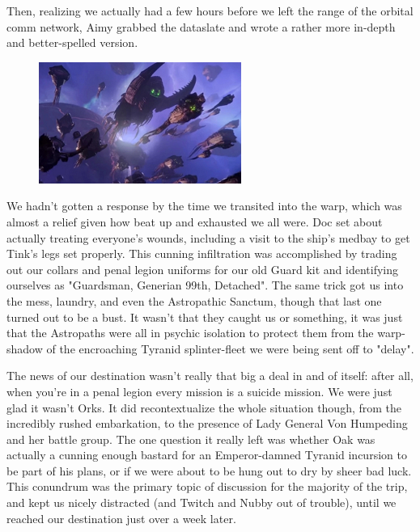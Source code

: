 Then, realizing we actually had a few hours before we left the range of the orbital comm network, Aimy grabbed the dataslate and wrote a rather more in-depth and better-spelled version. 


\begin{figure}
	\begin{center}
		\includegraphics[width=\figwidth]{pics/21/122.png}
	\end{center}
\end{figure}
We hadn't gotten a response by the time we transited into the warp, which was almost a relief given how beat up and exhausted we all were. 
Doc set about actually treating everyone's wounds, including a visit to the ship's medbay to get Tink's legs set properly. 
This cunning infiltration was accomplished by trading out our collars and penal legion uniforms for our old Guard kit and identifying ourselves as "Guardsman, Generian 99th, Detached". 
The same trick got us into the mess, laundry, and even the Astropathic Sanctum, though that last one turned out to be a bust. 
It wasn't that they caught us or something, it was just that the Astropaths were all in psychic isolation to protect them from the warp-shadow of the encroaching Tyranid splinter-fleet we were being sent off to "delay".

The news of our destination wasn't really that big a deal in and of itself: 
after all, when you're in a penal legion every mission is a suicide mission. 
We were just glad it wasn't Orks. 
It did recontextualize the whole situation though, from the incredibly rushed embarkation, to the presence of Lady General Von Humpeding and her battle group. 
The one question it really left was whether Oak was actually a cunning enough bastard for an Emperor-damned Tyranid incursion to be part of his plans, or if we were about to be hung out to dry by sheer bad luck. 
This conundrum was the primary topic of discussion for the majority of the trip, and kept us nicely distracted (and Twitch and Nubby out of trouble), until we reached our destination just over a week later.

